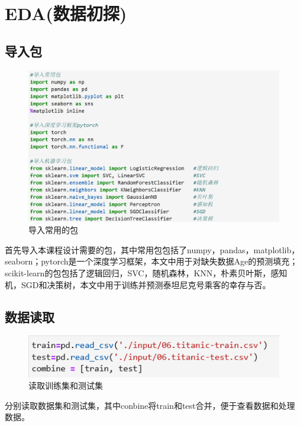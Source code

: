 \section{EDA(数据初探)}
\subsection{导入包}
		\begin{figure}[H]
			\centering
			\includegraphics[scale=0.40,angle=0]{images/2.png}
			\caption{导入常用的包}
			\label{2}
		\end{figure}
首先导入本课程设计需要的包，其中常用包包括了numpy，pandas，matplotlib，seaborn；pytorch是一个深度学习框架，本文中用于对缺失数据Age的预测填充；scikit-learn的包包括了逻辑回归，SVC，随机森林，KNN，朴素贝叶斯，感知机，SGD和决策树，本文中用于训练并预测泰坦尼克号乘客的幸存与否。

\subsection{数据读取}
\begin{figure}[H]
	\centering
	\includegraphics[scale=1.0,angle=0]{images/3.png}
	\caption{读取训练集和测试集}
	\label{3}
\end{figure}
分别读取数据集和测试集，其中conbine将train和test合并，便于查看数据和处理数据。
		
